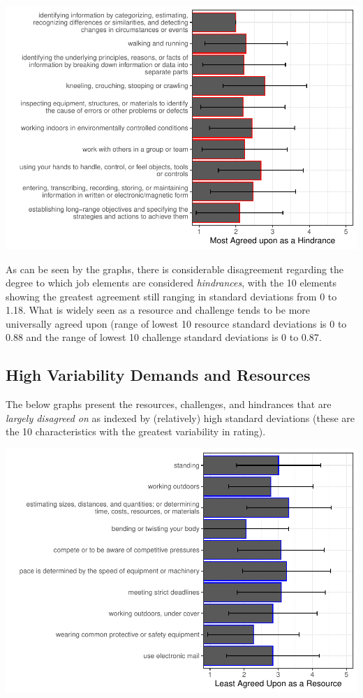 \documentclass[
  english,
  man]{apa6}
\begin{document}
\includegraphics{Submission_files/figure-latex/hindrancesagree-1.pdf}

As can be seen by the graphs, there is considerable disagreement regarding the degree to which job elements are considered \emph{hindrances}, with the 10 elements showing the greatest agreement still ranging in standard deviations from 0 to 1.18. What is widely seen as a resource and challenge tends to be more universally agreed upon (range of lowest 10 resource standard deviations is 0 to 0.88 and the range of lowest 10 challenge standard deviations is 0 to 0.87.

\hypertarget{high-variability-demands-and-resources}{%
\subsection{High Variability Demands and Resources}\label{high-variability-demands-and-resources}}

The below graphs present the resources, challenges, and hindrances that are \emph{largely disagreed on} as indexed by (relatively) high standard deviations (these are the 10 characteristics with the greatest variability in rating).

\includegraphics{Submission_files/figure-latex/resourceshisd-1.pdf}
\end{document}

